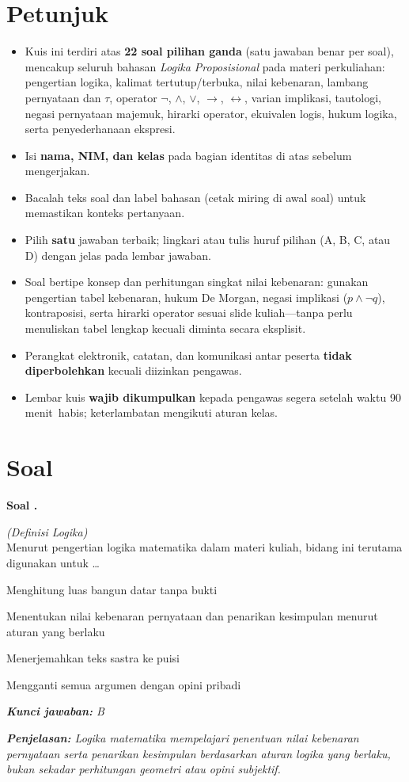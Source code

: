 \documentclass[12pt,a4paper]{article}
\newcommand{\WaktuKuis}{90 menit}
\newcommand{\kuncijawaban}[2]{%
  \par\vspace{0.25em}%
  {\small
  \textit{\textbf{Kunci jawaban:} #1}\par
  \textit{\textbf{Penjelasan:} #2}%
  \par\vspace{0.55em}}%
}
\newcounter{soalkuis}
\newcommand{\soalkuis}{%
  \refstepcounter{soalkuis}%
  \par\vspace{0.6ex plus 0.15ex}%
  \noindent\textbf{Soal \thesoalkuis.}\quad
}
\begin{document}
\section*{Petunjuk}
\begin{itemize}[leftmargin=*, itemsep=0.25em]
  \item Kuis ini terdiri atas \textbf{22 soal pilihan ganda} (satu jawaban benar per soal), mencakup seluruh bahasan \textit{Logika Proposisional} pada materi perkuliahan: pengertian logika, kalimat tertutup/terbuka, nilai kebenaran, lambang pernyataan dan \(\tau\), operator \(\neg\), \(\wedge\), \(\vee\), \(\rightarrow\), \(\leftrightarrow\), varian implikasi, tautologi, negasi pernyataan majemuk, hirarki operator, ekuivalen logis, hukum logika, serta penyederhanaan ekspresi.
  \item Isi \textbf{nama, NIM, dan kelas} pada bagian identitas di atas sebelum mengerjakan.
  \item Bacalah teks soal dan label bahasan (cetak miring di awal soal) untuk memastikan konteks pertanyaan.
  \item Pilih \textbf{satu} jawaban terbaik; lingkari atau tulis huruf pilihan (A, B, C, atau D) dengan jelas pada lembar jawaban.
  \item Soal bertipe konsep dan perhitungan singkat nilai kebenaran: gunakan pengertian tabel kebenaran, hukum De Morgan, negasi implikasi (\(p \wedge \neg q\)), kontraposisi, serta hirarki operator sesuai slide kuliah---tanpa perlu menuliskan tabel lengkap kecuali diminta secara eksplisit.
  \item Perangkat elektronik, catatan, dan komunikasi antar peserta \textbf{tidak diperbolehkan} kecuali diizinkan pengawas.
  \item Lembar kuis \textbf{wajib dikumpulkan} kepada pengawas segera setelah waktu \WaktuKuis\ habis; keterlambatan mengikuti aturan kelas.
\end{itemize}

\section*{Soal}

\soalkuis
\textit{(Definisi Logika)}\\
Menurut pengertian logika matematika dalam materi kuliah, bidang ini terutama digunakan untuk \ldots
\begin{pilihan}
  \item Menghitung luas bangun datar tanpa bukti
  \item Menentukan nilai kebenaran pernyataan dan penarikan kesimpulan menurut aturan yang berlaku
  \item Menerjemahkan teks sastra ke puisi
  \item Mengganti semua argumen dengan opini pribadi
\end{pilihan}
\kuncijawaban{B}{Logika matematika mempelajari penentuan nilai kebenaran pernyataan serta penarikan kesimpulan berdasarkan aturan logika yang berlaku, bukan sekadar perhitungan geometri atau opini subjektif.}
\end{document}
